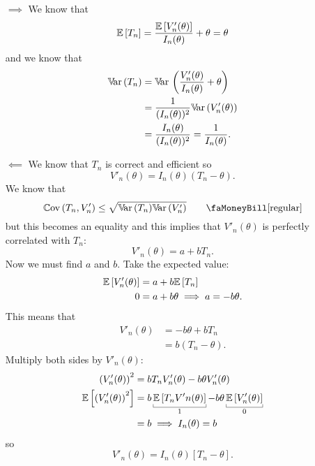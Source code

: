 \documentclass[12pt]{report}
\begin{document}
\begin{fancyproof}
	\begin{enumerate}
		\item[$\implies$] We know that
		\begin{equation*}
			\mathbb{E}\left[T_{n}\right]=\frac{\mathbb{E}\left[V'_{n}(\theta)\right]}{I_{n}(\theta)}+\theta=\theta
		\end{equation*} 
		and we know that
		\begin{align*}
			\mathbb{V}\!\mathrm{ar}\,(T_{n})
			&=\mathbb{V}\!\mathrm{ar}\,\left(\frac{V'_{n}(\theta)}{I_{n}(\theta)}+\theta\right)\\
			&=\frac{1}{(I_{n}(\theta))^{2}}\mathbb{V}\!\mathrm{ar}\,(V'_{n}(\theta))\\
			&=\frac{I_{n}(\theta)}{(I_{n}(\theta))^{2}}=\frac{1}{I_{n}(\theta)}.
		\end{align*}
	\item[$\impliedby$] We know that $T_{n}$ is correct and efficient so 
	\begin{equation*}
		V'_{n}(\theta)=I_{n}(\theta)(T_{n}-\theta).
	\end{equation*}
	We know that 
	\begin{equation*}
		\cov(T_{n},V'_{n})\leq\sqrt{\var(T_{n})\var(V'_{n})}\tag*{\faMoneyBill[regular]}\label{money}
	\end{equation*}
	but this becomes an equality and this implies that $V'_{n}(\theta)$ is perfectly correlated with $T_{n}$:
	\begin{equation*}
		V'_{n}(\theta)=a+bT_{n}.
	\end{equation*}
	Now we must find $a$ and $b$. Take the expected value:
	\begin{align*}
		\mathbb{E}\left[V'_{n}(\theta)\right]&=a+b\mathbb{E}\left[T_{n}\right]\\
		0&=a+b\theta\implies a=-b\theta.
	\end{align*}
	This means that 
	\begin{align*}
		V'_{n}(\theta)&=-b\theta+bT_{n}\\
		&=b(T_{n}-\theta).
	\end{align*}
	Multiply both sides by $V'_{n}(\theta)$:
	\begin{align*}
		\left(V'_{n}(\theta)\right)^{2}&=bT_{n}V'_{n}(\theta)-b\theta V'_{n}(\theta)\\
		\ev{\left(V'_{n}(\theta)\right)^{2}}&=b\ubracketthin{\ev{T_{n}V'n(\theta)}}_{1}-b\theta\ubracketthin{\ev{V'_{n}(\theta)}}_{0}\\
		&=b\implies I_{n}(\theta)=b
	\end{align*}
	so
	\begin{equation*}
		V'_{n}(\theta)=I_{n}(\theta)\left[T_{n}-\theta\right].
	\end{equation*}
\end{enumerate}
\end{fancyproof}
\end{document}
